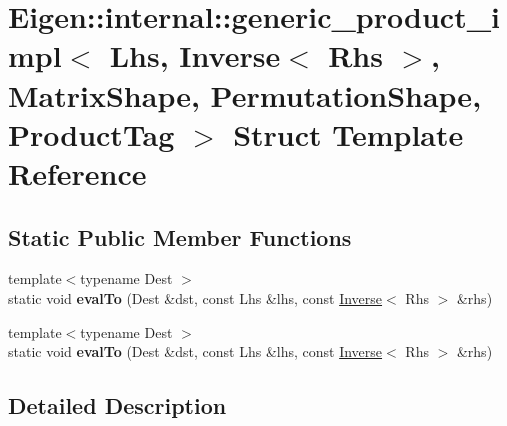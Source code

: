 \hypertarget{struct_eigen_1_1internal_1_1generic__product__impl_3_01_lhs_00_01_inverse_3_01_rhs_01_4_00_01_ma98d6fa405abbfe2d34bd4bd3f95df76a}{}\section{Eigen\+:\+:internal\+:\+:generic\+\_\+product\+\_\+impl$<$ Lhs, Inverse$<$ Rhs $>$, Matrix\+Shape, Permutation\+Shape, Product\+Tag $>$ Struct Template Reference}
\label{struct_eigen_1_1internal_1_1generic__product__impl_3_01_lhs_00_01_inverse_3_01_rhs_01_4_00_01_ma98d6fa405abbfe2d34bd4bd3f95df76a}
\subsection*{Static Public Member Functions}
\begin{DoxyCompactItemize}
\item 
\mbox{\label{struct_eigen_1_1internal_1_1generic__product__impl_3_01_lhs_00_01_inverse_3_01_rhs_01_4_00_01_ma98d6fa405abbfe2d34bd4bd3f95df76a_a15ae32a9b4f789bcac9b3a9ed10229f0}} 
{\footnotesize template$<$typename Dest $>$ }\\static void {\bfseries eval\+To} (Dest \&dst, const Lhs \&lhs, const \hyperlink{class_eigen_1_1_inverse}{Inverse}$<$ Rhs $>$ \&rhs)
\item 
\mbox{\label{struct_eigen_1_1internal_1_1generic__product__impl_3_01_lhs_00_01_inverse_3_01_rhs_01_4_00_01_ma98d6fa405abbfe2d34bd4bd3f95df76a_a15ae32a9b4f789bcac9b3a9ed10229f0}} 
{\footnotesize template$<$typename Dest $>$ }\\static void {\bfseries eval\+To} (Dest \&dst, const Lhs \&lhs, const \hyperlink{class_eigen_1_1_inverse}{Inverse}$<$ Rhs $>$ \&rhs)
\end{DoxyCompactItemize}


\subsection{Detailed Description}
